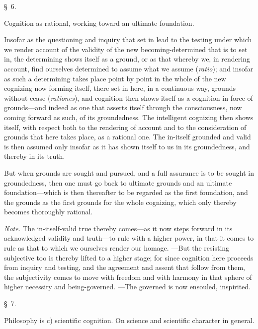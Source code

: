\documentclass[12pt,a4paper]{book}
\begin{document}
\begin{center}\large\S~6.\end{center}
\begin{center}Cognition as rational, working toward an ultimate foundation.\end{center}

Insofar as the questioning and inquiry that set in lead to the testing under which
we render account of the validity of the new becoming-determined that is to set
in, the determining shows itself as a ground, or as that whereby we, in rendering
account, find ourselves determined to assume what we assume (\textit{ratio}); and
insofar as such a determining takes place point by point in the whole of the new
cognizing now forming itself, there set in here, in a continuous way, grounds
without cease (\textit{rationes}), and cognition then shows itself as a cognition
in force of grounds---and indeed as one that asserts itself through the
consciousness, now coming forward as such, of its groundedness. The intelligent
cognizing then shows itself, with respect both to the rendering of account and to
the consideration of grounds that here takes place, as a rational one. The
in-itself grounded and valid is then assumed only insofar as it has shown itself
to us in its groundedness, and thereby in its truth.

But when grounds are sought and pursued, and a full assurance is to be sought in
groundedness, then one must go back to ultimate grounds and an ultimate
foundation---which is then thereafter to be regarded as the first foundation, and
the grounds as the first grounds for the whole cognizing, which only thereby
becomes thoroughly rational.

{\small\emph{Note.} The in-itself-valid true thereby comes---as it now steps
forward in its acknowledged validity and truth---to rule with a higher power, in
that it comes to rule as that to which we ourselves render our homage. ---But the
resisting subjective too is thereby lifted to a higher stage; for since cognition
here proceeds from inquiry and testing, and the agreement and assent that follow
from them, the subjectivity comes to move with freedom and with harmony in that
sphere of higher necessity and being-governed. ---The governed is now ensouled,
inspirited.\par}

\begin{center}\large\S~7.\end{center}
\begin{center}Philosophy is c) scientific cognition. On science and scientific
character in general.\end{center}
\end{document}
